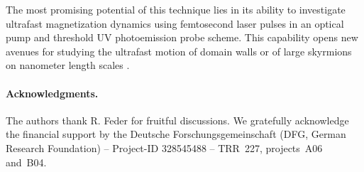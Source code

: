 \documentclass[prl,twocolumn,floatfix,superscriptaddress,aps]{revtex4-2}
\begin{document}
The most promising potential of this technique lies in its ability to investigate ultrafast magnetization dynamics using femtosecond laser pulses in an optical pump and threshold UV photoemission probe scheme. This capability opens new avenues for studying the ultrafast motion of domain walls \cite{parkin2008} or of large skyrmions on nanometer length scales \cite{goebel2019,jani2021,kern2022}.

\paragraph{Acknowledgments.} 
The authors thank R. Feder for fruitful discussions. We gratefully acknowledge the financial support by the Deutsche Forschungsgemeinschaft (DFG, German Research Foundation) -- Project-ID 328545488 -- TRR~227, projects~A06 and~B04.

 
\end{document}

